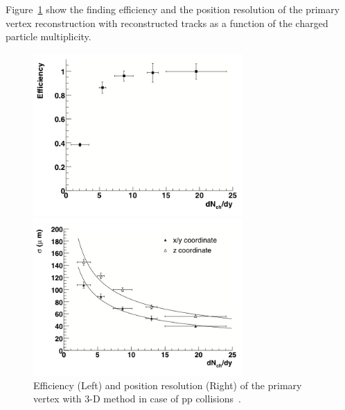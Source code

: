 Figure~\ref{fig_3_vtxperformance} show the finding efficiency and the position resolution of the primary vertex reconstruction with reconstructed tracks as a function of the charged particle multiplicity. 
\begin{figure}[!h]
  \begin{minipage}{0.5\hsize}
    \begin{center}
      \includegraphics[width=8cm]{chap3/figure/Vertexing/Efficiency_Vtx.png}
    \end{center}
  \end{minipage}
  \begin{minipage}{0.5\hsize}
    \begin{center}
      \includegraphics[width=8cm]{chap3/figure/Vertexing/Resolution_Vtx.png}
    \end{center}
  \end{minipage}
  \caption{ 
    Efficiency (Left) and position resolution (Right) of the primary vertex with 3-D method in case of pp collisions~\cite{bib_vtxreso}.  
  }
  \label{fig_3_vtxperformance}
\end{figure}

